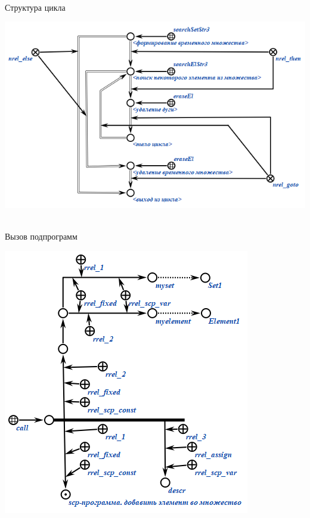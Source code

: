 \begin{frame}{\\Структура цикла}
	\topline
	\justifying
	\vspace{10mm}
	
	\begin{center}
		\includegraphics[scale=0.7]{figures/sd_scp/cycle_operators.png}
	\end{center}
	
\end{frame}

\begin{frame}{\\Вызов подпрограмм}
	\topline
	\justifying
	\vspace{10mm}
	
	\begin{center}
		\includegraphics[scale=0.55]{figures/sd_scp/call.png}
	\end{center}
	
\end{frame}

